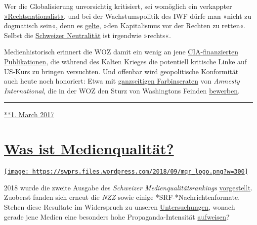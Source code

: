 Wer die Global­isierung unvor­sichtig kriti­siert, sei womöglich ein
verkappter
\href{https://www.woz.ch/1708/wirtschaftlicher-protektionismus/die-voelkische-kritik-an-der-globalisierung}{»Rechts­nationa­list«},
und bei der Wachs­tums­politik des IWF dürfe man »nicht zu dogma­tisch
sein«, denn es
\href{https://www.woz.ch/1742/weltwirtschaft/die-hueterin-des-kapitalismus}{gelte},
»den Kapita­lismus vor der Rechten zu retten«. Selbst die
\href{https://www.woz.ch/1414/schweizerische-aussenpolitik/opportunistische-neutralitaet}{Schweizer
Neutra­lität} ist irgendwie »rechts«.

Medien­historisch erinnert die WOZ damit ein wenig an jene
\href{https://www.youtube.com/watch?v=3QAgCFjNXJE}{CIA-finanzierten
Publika­tionen}, die während des Kalten Krieges die potentiell kritische
Linke auf US-Kurs zu bringen versuchten. Und offenbar wird
geo­poli­tische Konfor­mität auch heute noch honoriert: Etwa mit
\href{https://swprs.files.wordpress.com/2017/10/amnesty-international-werbung.png}{ganz­seitigen
Farb­inseraten} von \emph{Amnesty Inter­national}, die in der WOZ den
Sturz von Washingtons Feinden
\href{https://consortiumnews.com/2012/06/18/amnestys-shilling-for-us-wars/}{bewerben}.

\begin{center}\rule{0.5\linewidth}{\linethickness}\end{center}

\href{https://swprs.org/2017/03/01/die-woz-und-die-weltpolitik/}{**1.
March 2017}

\hypertarget{was-ist-medienqualituxe4t}{%
\section{\texorpdfstring{\href{https://swprs.org/2017/03/01/medienqualitaet/}{Was
ist
Medienqualität?}}{Was ist Medienqualität?}}\label{was-ist-medienqualituxe4t}}

\href{https://swprs.org/2017/03/01/medienqualitaet/}{\texttt{[image: https://swprs.files.wordpress.com/2018/09/mqr\_logo.png?w=300]}}

2018 wurde die zweite Ausgabe des \emph{Schweizer
Medien­qualitäts­rankings}
\href{http://medienqualitaet-schweiz.ch/files/3115/3578/3114/MQR-18_Hauptbefunde.pdf}{vorgestellt}.
Zuoberst fanden sich erneut die \emph{NZZ} sowie einige
*SRF-*Nach­rich­ten­for­mate. Stehen diese Resultate im Widerspruch zu
unseren \href{https://swprs.org/die-nzz-studie/}{Untersuchungen}, wonach
gerade jene Medien eine besonders hohe Propaganda-Intensität
\href{https://swprs.org/srf-propaganda-analyse/}{aufweisen}?

